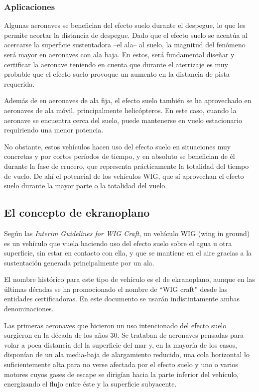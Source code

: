 \subsubsection{Aplicaciones}
\label{sec:wig:ge:applications}

Algunas aeronaves se benefician del efecto suelo durante el despegue, lo que les permite acortar la distancia de despegue. Dado que el efecto suelo se acentúa al acercarse la superficie sustentadora –el ala– al suelo, la magnitud del fenómeno será mayor en aeronaves con ala baja. En estos, será fundamental diseñar y certificar la aeronave teniendo en cuenta que durante el aterrizaje es muy probable que el efecto suelo provoque un aumento en la distancia de pista requerida.

Además de en aeronaves de ala fija, el efecto suelo también se ha aprovechado en aeronaves de ala móvil, principalmente helicópteros. En este caso, cuando la aeronave se encuentra cerca del suelo, puede mantenerse en vuelo estacionario requiriendo una menor potencia.

No obstante, estos vehículos hacen uso del efecto suelo en situaciones muy concretas y por cortos períodos de tiempo, y en absoluto se benefician de él durante la fase de crucero, que representa prácticamente la totalidad del tiempo de vuelo. De ahí el potencial de los vehículos WIG, que sí aprovechan el efecto suelo durante la mayor parte o la totalidad del vuelo.


\subsection{El concepto de ekranoplano}
\label{sec:wig:ekranoplane}

Según las \emph{Interim Guidelines for WIG Craft}, un vehículo WIG (wing in ground) es un vehículo que vuela haciendo uso del efecto suelo sobre el agua u otra superficie, sin estar en contacto con ella, y que se mantiene en el aire gracias a la sustentación generada principalmente por un ala.

El nombre histórico para este tipo de vehículo es el de ekranoplano, aunque en las últimas décadas se ha promocionado el nombre de “WIG craft” desde las entidades certificadoras. En este documento se usarán indistintamente ambas denominaciones.

Las primeras aeronaves que hicieron un uso intencionado del efecto suelo surgieron en la década de los años 30. Se trataban de aeronaves pensadas para volar a poca distancia del la superficie del mar y, en la mayoría de los casos, disponían de un ala media-baja de alargamiento reducido, una cola horizontal lo suficientemente alta para no verse afectada por el efecto suelo y uno o varios motores cuyos gases de escape se dirigían hacia la parte inferior del vehículo, energizando el flujo entre éste y la superficie subyacente.


